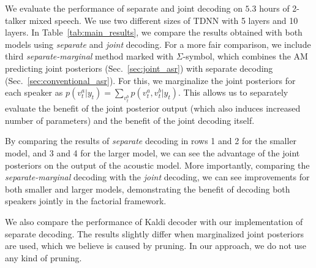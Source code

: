 \documentclass[a4paper]{article}
\newcommand{\spkrA}{a}
\newcommand{\spkrB}{b}
\begin{document}
We evaluate the performance of separate and joint decoding on $5.3$ hours of 2-talker mixed speech.
We use two different sizes of TDNN with 5 layers and 10 layers. In Table~\ref{tab:main_results}, we compare the results obtained with both models using \textit{separate} and \textit{joint} decoding. 
For a more fair comparison, we include third \textit{separate-marginal} method marked with $\Sigma$-symbol, which combines the AM predicting joint posteriors (Sec.~\ref{sec:joint_asr}) with separate decoding (Sec.~\ref{sec:conventional_asr}). For this, we marginalize the joint posteriors for each speaker as $p(v^{\spkrA}_t|y_t) = \sum_{v^{\spkrB}_t} p(v^{\spkrA}_t, v^{\spkrB}_t | y_t)$. This allows us to separately evaluate the benefit of the joint posterior output (which also induces increased number of parameters) and the benefit of the joint decoding itself.

By comparing the results of \textit{separate} decoding in rows 1 and 2 for the smaller model, and 3 and 4 for the larger model, we can see the advantage of the joint posteriors on the output of the acoustic model. More importantly, comparing the \textit{separate-marginal} decoding with the \textit{joint} decoding, we can see improvements for both smaller and larger models, demonstrating the benefit of decoding both speakers jointly in the factorial framework.

We also compare the performance of Kaldi decoder with our implementation of separate decoding.
The results slightly differ when marginalized joint posteriors are used, which we believe is caused by pruning. In our approach, we do not use any kind of pruning.


\end{document}
